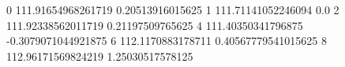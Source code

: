 0 111.91654968261719 0.20513916015625
1 111.71141052246094 0.0
2 111.92338562011719 0.21197509765625
4 111.40350341796875 -0.3079071044921875
6 112.1170883178711 0.40567779541015625
8 112.96171569824219 1.25030517578125
